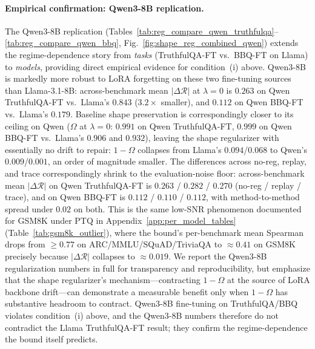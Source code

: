 \paragraph{Empirical confirmation: Qwen3-8B replication.}
The Qwen3-8B replication (Tables~\ref{tab:reg_compare_qwen_truthfulqa}--\ref{tab:reg_compare_qwen_bbq}, Fig.~\ref{fig:shape_reg_combined_qwen}) extends the regime-dependence story from \emph{tasks} (TruthfulQA-FT vs.\ BBQ-FT on Llama) to \emph{models}, providing direct empirical evidence for condition~(i) above. Qwen3-8B is markedly more robust to LoRA forgetting on these two fine-tuning sources than Llama-3.1-8B: across-benchmark mean $|\Delta\mathcal{R}|$ at $\lambda{=}0$ is $0.263$ on Qwen TruthfulQA-FT vs.\ Llama's $0.843$ ($3.2\times$ smaller), and $0.112$ on Qwen BBQ-FT vs.\ Llama's $0.179$. Baseline shape preservation is correspondingly closer to its ceiling on Qwen ($\Omega$ at $\lambda{=}0$: $0.991$ on Qwen TruthfulQA-FT, $0.999$ on Qwen BBQ-FT vs.\ Llama's $0.906$ and $0.932$), leaving the shape regularizer with essentially no drift to repair: $1-\Omega$ collapses from Llama's $0.094$/$0.068$ to Qwen's $0.009$/$0.001$, an order of magnitude smaller. The differences across no-reg, replay, and trace correspondingly shrink to the evaluation-noise floor: across-benchmark mean $|\Delta\mathcal{R}|$ on Qwen TruthfulQA-FT is $0.263$ / $0.282$ / $0.270$ (no-reg / replay / trace), and on Qwen BBQ-FT is $0.112$ / $0.110$ / $0.112$, with method-to-method spread under $0.02$ on both. This is the same low-SNR phenomenon documented for GSM8K under PTQ in Appendix~\ref{app:per_model_tables} (Table~\ref{tab:gsm8k_outlier}), where the bound's per-benchmark mean Spearman drops from $\ge 0.77$ on ARC/MMLU/SQuAD/TriviaQA to $\approx 0.41$ on GSM8K precisely because $|\Delta\mathcal{R}|$ collapses to $\approx 0.019$. We report the Qwen3-8B regularization numbers in full for transparency and reproducibility, but emphasize that the shape regularizer's mechanism---contracting $1-\Omega$ at the source of LoRA backbone drift---can demonstrate a measurable benefit only when $1-\Omega$ has substantive headroom to contract. Qwen3-8B fine-tuning on TruthfulQA/BBQ violates condition~(i) above, and the Qwen3-8B numbers therefore do not contradict the Llama TruthfulQA-FT result; they confirm the regime-dependence the bound itself predicts.

